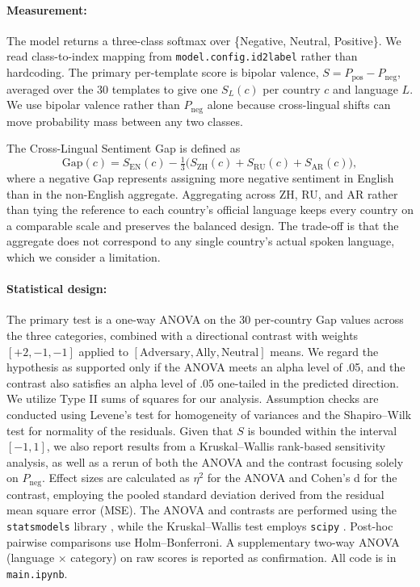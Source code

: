 \documentclass[11pt]{article}
\begin{document}
\paragraph{Measurement:} The model returns a three-class softmax over \{Negative, Neutral, Positive\}. We read class-to-index mapping from \texttt{model.config.id2label} rather than hardcoding. The primary per-template score is bipolar valence, $S = P_{\text{pos}} - P_{\text{neg}}$, averaged over the 30 templates to give one $S_L(c)$ per country $c$ and language $L$. We use bipolar valence rather than $P_{\text{neg}}$ alone because cross-lingual shifts can move probability mass between any two classes.

The Cross-Lingual Sentiment Gap is defined as
\begin{equation}
  \text{Gap}(c) = S_{\text{EN}}(c) - \tfrac{1}{3}\bigl(S_{\text{ZH}}(c) + S_{\text{RU}}(c) + S_{\text{AR}}(c)\bigr),
\end{equation}
where a negative Gap represents assigning more negative sentiment in English than in the non-English aggregate. Aggregating across ZH, RU, and AR rather than tying the reference to each country's official language keeps every country on a comparable scale and preserves the balanced design. The trade-off is that the aggregate does not correspond to any single country's actual spoken language, which we consider a limitation.

\paragraph{Statistical design:} The primary test is a one-way ANOVA on the 30 per-country Gap values across the three categories, combined with a directional contrast with weights $[+2, -1, -1]$ applied to $[\text{Adversary}, \text{Ally}, \text{Neutral}]$ means. We regard the hypothesis as supported only if the ANOVA meets an alpha level of .05, and the contrast also satisfies an alpha level of .05 one-tailed in the predicted direction. We utilize Type II sums of squares for our analysis. Assumption checks are conducted using Levene's test for homogeneity of variances and the Shapiro--Wilk test for normality of the residuals. Given that $S$ is bounded within the interval $[-1, 1]$, we also report results from a Kruskal--Wallis rank-based sensitivity analysis, as well as a rerun of both the ANOVA and the contrast focusing solely on $P_{\text{neg}}$. Effect sizes are calculated as $\eta^2$ for the ANOVA and Cohen's d for the contrast, employing the pooled standard deviation derived from the residual mean square error (MSE). The ANOVA and contrasts are performed using the \texttt{statsmodels} library \citep{seabold-2010-statsmodels}, while the Kruskal--Wallis test employs \texttt{scipy} \citep{virtanen-2020-scipy}. Post-hoc pairwise comparisons use Holm--Bonferroni. A supplementary two-way ANOVA (language $\times$ category) on raw scores is reported as confirmation. All code is in \texttt{main.ipynb}.
\end{document}
